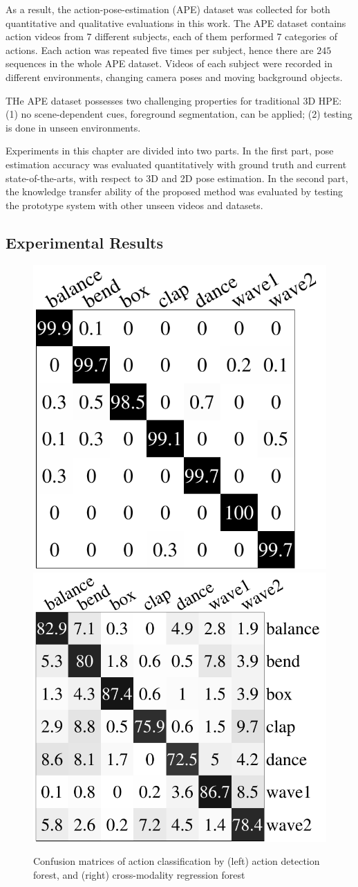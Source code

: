 As a result, the action-pose-estimation (APE) dataset was collected for both quantitative and qualitative evaluations in this work. The APE dataset contains action videos from $7$ different subjects, each of them performed $7$ categories of actions. Each action was repeated five times per subject, hence there are $245$ sequences in the whole APE dataset.     
Videos of each subject were recorded in different environments, changing camera poses and moving background objects. 

THe APE dataset possesses two challenging properties for traditional 3D HPE: (1) no scene-dependent cues, \eg foreground segmentation, can be applied; (2) testing is done in unseen environments.

Experiments in this chapter are divided into two parts. In the first part, pose estimation accuracy was evaluated quantitatively with ground truth and current state-of-the-arts, with respect to 3D and 2D pose estimation. In the second part, the knowledge transfer ability of the proposed method was evaluated by testing the prototype system with other unseen videos and datasets. 

\subsection{Experimental Results}

\begin{figure}[ht]
	\centering
	\includegraphics[height=0.30\linewidth]{fig/body/confm_detection.pdf} \hspace{1cm} 
	\includegraphics[height=0.30\linewidth]{fig/body/confm_regression.pdf}
	\caption{Confusion matrices of action classification by (left) action detection forest, and (right) cross-modality regression forest} 
	\label{fig/body/confm}
\end{figure}

